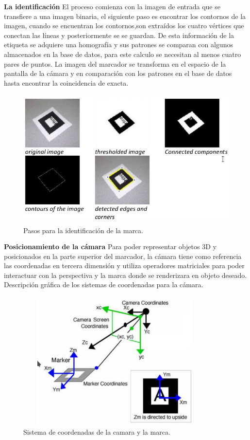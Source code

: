 \textbf{La identificación}
El proceso comienza con la imagen de entrada que se transfiere a una imagen binaria, el siguiente paso es encontrar los contornos de la imagen, cuando se encuentran los contornos,son extraídos los cuatro vértices que conectan las líneas y posteriormente se se guardan. De esta información de la etiqueta se adquiere una homografía y sus patrones se comparan con algunos almacenados en la base de datos, para este calculo se necesitan al menos cuatro pares de puntos. La imagen del marcador se transforma en el espacio de la pantalla de la cámara y en comparación con los patrones en el
base de datos hasta encontrar la coincidencia de exacta.
\begin{figure}[h!]
	\centering
	\includegraphics[width=14cm,height=7cm]{imagenes/marcoteorico/plataformas/squareMarkersARtookik.png}
	\caption{Pasos para la identificación de la marca.\cite{B13}}
	\label{fig:analogo}
\end{figure}
\newpage

\textbf{Posicionamiento de la cámara} Para poder representar objetos 3D y posicionados en la parte superior del marcador, la cámara tiene como referencia las coordenadas en tercera dimensión y utiliza operadores matriciales para poder interactuar con la perspectiva y la marca donde se renderizara en objeto deseado. Descripción gráfica de los sistemas de coordenadas para la cámara.
\begin{figure}[h!]
	\centering
	\includegraphics[width=10cm,height=7cm]{imagenes/marcoteorico/plataformas/positionMarkerARToolKit.png}
	\caption{Sistema de coordenadas de la camara y la marca.\cite{B13}}
	\label{fig:analogo}
\end{figure}

